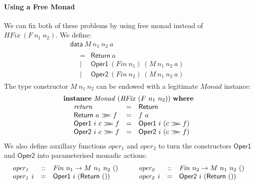 \documentclass{llncs}
\newcommand{\mbind}{\mathrel{>\kern-0.45em>\kern-0.45em=}}
\begin{document}
\paragraph{Using a Free Monad} We can fix both of these problems by
using free monad instead of $\mathit{HFix}~(F~n_1~n_2)$. We define:
\begin{displaymath}
  \begin{array}{l}
    \mathsf{data}~M~n_1~n_2~a \\
    \quad
    \begin{array}{cl}
      = & \mathsf{Return}~a \\
      | & \mathsf{Oper1}~(\mathit{Fin}~n_1)~(M~n_1~n_2~a) \\
      | & \mathsf{Oper2}~(\mathit{Fin}~n_2)~(M~n_1~n_2~a)
    \end{array}
  \end{array}
\end{displaymath}
The type constructor $M~n_1~n_2$ can be endowed with a legitimate
$\mathit{Monad}$ instance:
\begin{displaymath}
  \begin{array}{l}
    \mathbf{instance}~\mathit{Monad}~(\mathit{HFix}~(F~n_1~n_2))~\mathbf{where} \\
    \quad
    \begin{array}{lcl}
      \mathit{return}             &=& \mathsf{Return} \\
      \mathsf{Return}~a \mbind f  &=& f~a \\
      \mathsf{Oper1}~i~c \mbind f &=& \mathsf{Oper1}~i~(c \mbind f) \\
      \mathsf{Oper2}~i~c \mbind f &=& \mathsf{Oper2}~i~(c \mbind f) \\
    \end{array}
  \end{array}
\end{displaymath}
We also define auxillary functions $\mathit{oper_1}$ and
$\mathit{oper_2}$ to turn the constructors $\mathsf{Oper1}$ and
$\mathsf{Oper2}$ into parameterised monadic actions:
\begin{displaymath}
  \begin{array}{c@{\hspace{2em}}c}
    \begin{array}{lcl}
      \mathit{oper_1} &::& \mathit{Fin}~n_1 \to M~n_1~n_2~() \\
      \mathit{oper_1}~i &=& \mathsf{Oper1}~i~(\mathsf{Return}~())
    \end{array}
    &
    \begin{array}{lcl}
      \mathit{oper_2} &::& \mathit{Fin}~n_2 \to M~n_1~n_2~() \\
      \mathit{oper_2}~i &=& \mathsf{Oper2}~i~(\mathsf{Return}~())
    \end{array}
  \end{array}
\end{displaymath}
\end{document}
